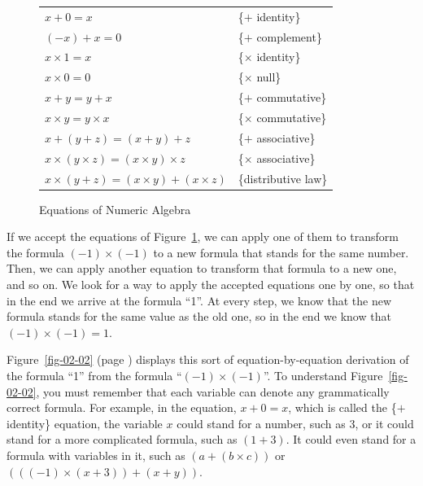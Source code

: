 \begin{figure}
\begin{center}
\begin{tabular}{ll}
$x+0 = x$                 & \{$+$ identity\} \\
$(-x)+ x = 0$             & \{$+$ complement\} \\
$x \times 1 = x$          & \{$\times$ identity\} \\
$x \times 0 = 0$          & \{$\times$ null\} \\
$x+y = y+x$               & \{$+$ commutative\} \\
$x \times y = y \times x$ & \{$\times$ commutative\} \\
$x+(y+z) = (x+y)+z$       & \{$+$ associative\} \\
$x \times (y \times z) = (x \times y) \times z$ & \{$\times$ associative\} \\
$x\times(y+z) = (x \times y)+(x \times z)$      & \{distributive law\} \\
\end{tabular}
\end{center}
\caption{Equations of Numeric Algebra}
\label{fig-02-01}
\end{figure}

If we accept the equations of Figure~\ref{fig-02-01},
we can apply one of them to transform the formula $(-1)\times(-1)$ to a new formula that
stands for the same number. Then, we can apply another equation to
transform that formula to a new one, and so on.
We look for a way to apply the
accepted equations one by one, so that in the end we
arrive at the formula ``1''. At every step, we know that the
new formula stands for the same value as the old one, so in
the end we know that $(-1)\times(-1) = 1$.

Figure~\ref{fig-02-02} (page \pageref{fig-02-02})
displays this sort of equation-by-equation derivation of the
formula ``1'' from the formula ``$(-1)\times(-1)$''. To
understand Figure~\ref{fig-02-02}, you must remember that each
variable can denote any
grammatically correct formula. For example, in the
equation, $x + 0 = x$,
which is called the \{$+$ identity\} equation,
the variable $x$ could stand for a number,
such as 3, or it could stand for a more complicated
formula, such as $(1 + 3)$. It could even stand for a formula
with variables in it, such as $(a + (b \times c))$ or
$(((-1) \times (x + 3)) + (x + y))$.

